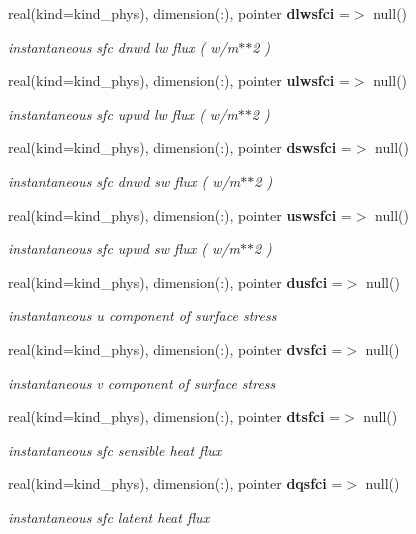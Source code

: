 \begin{DoxyCompactItemize}
real(kind=kind\+\_\+phys), dimension(\+:), pointer \textbf{ dlwsfci} =$>$ null()
\begin{DoxyCompactList}\small\item\em instantaneous sfc dnwd lw flux ( w/m$\ast$$\ast$2 ) \end{DoxyCompactList}\item 
real(kind=kind\+\_\+phys), dimension(\+:), pointer \textbf{ ulwsfci} =$>$ null()
\begin{DoxyCompactList}\small\item\em instantaneous sfc upwd lw flux ( w/m$\ast$$\ast$2 ) \end{DoxyCompactList}\item 
real(kind=kind\+\_\+phys), dimension(\+:), pointer \textbf{ dswsfci} =$>$ null()
\begin{DoxyCompactList}\small\item\em instantaneous sfc dnwd sw flux ( w/m$\ast$$\ast$2 ) \end{DoxyCompactList}\item 
real(kind=kind\+\_\+phys), dimension(\+:), pointer \textbf{ uswsfci} =$>$ null()
\begin{DoxyCompactList}\small\item\em instantaneous sfc upwd sw flux ( w/m$\ast$$\ast$2 ) \end{DoxyCompactList}\item 
real(kind=kind\+\_\+phys), dimension(\+:), pointer \textbf{ dusfci} =$>$ null()
\begin{DoxyCompactList}\small\item\em instantaneous u component of surface stress \end{DoxyCompactList}\item 
real(kind=kind\+\_\+phys), dimension(\+:), pointer \textbf{ dvsfci} =$>$ null()
\begin{DoxyCompactList}\small\item\em instantaneous v component of surface stress \end{DoxyCompactList}\item 
real(kind=kind\+\_\+phys), dimension(\+:), pointer \textbf{ dtsfci} =$>$ null()
\begin{DoxyCompactList}\small\item\em instantaneous sfc sensible heat flux \end{DoxyCompactList}\item 
real(kind=kind\+\_\+phys), dimension(\+:), pointer \textbf{ dqsfci} =$>$ null()
\begin{DoxyCompactList}\small\item\em instantaneous sfc latent heat flux \end{DoxyCompactList}\item 

\end{DoxyCompactItemize}

